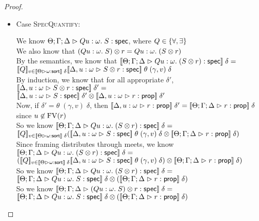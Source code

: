 \begin{proof}
\begin{itemize}
    \item Case \textsc{SpecQuantify}:
      \begin{tabbedproof}
        \oo We know $\judgeS{Q u:\omega.\; S}$, where $Q \in \setof{\forall, \exists}$ \\
        \oo We also know that $\Frame{(Q u:\omega.\; S)}{r} = Q u:\omega.\; (\Frame{S}{r})$ \\
        \oo By the semantics, we know that $\interp{\judgeS{Q u:\omega.\; (\Frame{S}{r)}}}\;\delta = $ \\
        \oox $\interp{Q}_{v \in \interp{\judgeSort{\omega}}\;\delta} \interp{\judgeS[\Delta, u:\omega]{\Frame{S}{r}}}\;\theta\;(\gamma, v)\;\delta$\\
        \oo By induction, we know that for all appropriate $\delta'$, 
               $\interp{\judgeS[\Delta, u:\omega]{\Frame{S}{r}}}\;\delta' = $ \\
        \oox $\Frame{\interp{\judgeS[\Delta, u:\omega]{S}}\;\delta'}{\interp{\judgeA[\Delta, u:\omega]{r}{\assert}}\;\delta'}$ \\
        \oo Now, if $\delta' = \theta\;(\gamma, v)\;\delta$, then $\interp{\judgeA[\Delta, u:\omega]{r}{\assert}}\;\delta' = 
                                                   \interp{\judgeA{r}{\assert}}\;\delta$ since $u \not\in \FV{r}$ \\
        \oo So we know $\interp{\judgeS{Q u:\omega.\; (\Frame{S}{r)}}}\;\delta = $ \\
        \oox $\interp{Q}_{v \in \interp{\judgeSort{\omega}}\;\delta} (\Frame{\interp{\judgeS[\Delta, u:\omega]{S}}\;\theta\;(\gamma, v)\;\delta}{\interp{\judgeA{r}{\assert}}\;\delta})$ \\
        \oo Since framing distributes through meets, we know $\interp{\judgeS{Q u:\omega.\; (\Frame{S}{r)}}}\;\delta = $ \\
        \oox $\Frame{(\interp{Q}_{v \in \interp{\judgeSort{\omega}}\;\delta} \interp{\judgeS[\Delta, u:\omega]{S}}\;\theta\;(\gamma, v)\;\delta)}{\interp{\judgeA{r}{\assert}}\;\delta})$ \\
        \oo So we know $\interp{\judgeS{Q u:\omega.\; (\Frame{S}{r)}}}\;\delta = $ \\
        \oox $\Frame{\interp{\judgeS{Q u:\omega.\;S}}\;\delta}{(\interp{\judgeA{r}{\assert}}\;\delta)}$ \\
        \oo So we know $\interp{\judgeS{\Frame{(Q u:\omega.\; S)}{r}}}\;\delta = $ \\
        \oox $\Frame{\interp{\judgeS{Q u:\omega.\;S}}\;\delta}{(\interp{\judgeA{r}{\assert}}\;\delta)}$ \\
        
      \end{tabbedproof}
  \end{itemize}
\end{proof}




